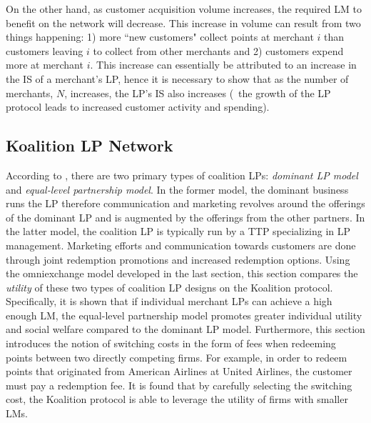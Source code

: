 On the other hand, as customer acquisition volume increases, the required LM to benefit on the network will decrease. This increase in volume can result from two things happening: 1) more ``new customers" collect points at merchant $i$ than customers leaving $i$ to collect from other merchants and 2) customers expend more at merchant $i$. This increase can essentially be attributed to an increase in the IS of a merchant's LP, hence it is necessary to show that as the number of merchants, $N$, increases, the LP's IS also increases (\ie\ the growth of the LP protocol leads to increased customer activity and spending). 

\subsection{Koalition LP Network}
%
According to \cite{Breu15}, there are two primary types of coalition LPs: \textit{dominant LP model} and \textit{equal-level partnership model}. In the former model, the dominant business runs the LP therefore communication and marketing revolves around the offerings of the dominant LP and is augmented by the offerings from the other partners. In the latter model, the coalition LP is typically run by a TTP specializing in LP management. Marketing efforts and communication towards customers are done through joint redemption promotions and increased redemption options. Using the omniexchange model developed in the last section, this section compares the \textit{utility} of these two types of coalition LP designs on the Koalition protocol. Specifically, it is shown that if individual merchant LPs can achieve a high enough LM, the equal-level partnership model promotes greater individual utility and social welfare compared to the dominant LP model. Furthermore, this section introduces the notion of switching costs in the form of fees when redeeming points between two directly competing firms. For example, in order to redeem points that originated from American Airlines at United Airlines, the customer must pay a redemption fee. It is found that by carefully selecting the switching cost, the Koalition protocol is able to leverage the utility of firms with smaller LMs. 
%
